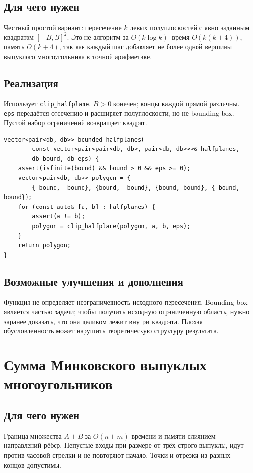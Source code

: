 \subsection*{Для чего нужен}
Честный простой вариант: пересечение $k$ левых полуплоскостей с явно
заданным квадратом $[-B,B]^2$. Это не алгоритм за $O(k\log k)$:
время $O(k(k+4))$, память $O(k+4)$, так как каждый шаг добавляет не более
одной вершины выпуклого многоугольника в точной арифметике.
\subsection*{Реализация}
Использует \texttt{clip\_halfplane}. $B>0$ конечен; концы каждой прямой
различны. \texttt{eps} передаётся отсечению и расширяет полуплоскости,
но не bounding box. Пустой набор ограничений возвращает квадрат.
\begin{lstlisting}[name=geometry_halfplanes]
vector<pair<db, db>> bounded_halfplanes(
        const vector<pair<pair<db, db>, pair<db, db>>>& halfplanes,
        db bound, db eps) {
    assert(isfinite(bound) && bound > 0 && eps >= 0);
    vector<pair<db, db>> polygon = {
        {-bound, -bound}, {bound, -bound}, {bound, bound}, {-bound, bound}};
    for (const auto& [a, b] : halfplanes) {
        assert(a != b);
        polygon = clip_halfplane(polygon, a, b, eps);
    }
    return polygon;
}
\end{lstlisting}
\subsection*{Возможные улучшения и дополнения}
Функция не определяет неограниченность исходного пересечения. Bounding box
является частью задачи; чтобы получить исходную ограниченную область,
нужно заранее доказать, что она целиком лежит внутри квадрата.
Плохая обусловленность может нарушить теоретическую структуру результата.


\fi
\iffalse
\section{Сумма Минковского выпуклых многоугольников}
\subsection*{Для чего нужен}
Граница множества $A+B$ за $O(n+m)$ времени и памяти слиянием направлений
рёбер. Непустые входы при размере от трёх строго выпуклы, идут против часовой
стрелки и не повторяют начало. Точки и отрезки из разных концов допустимы.
